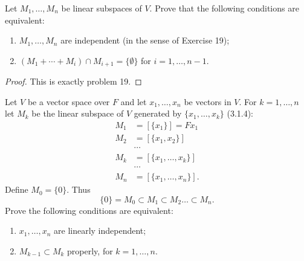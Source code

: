 \begin{tcolorbox}[title=Problem 23, breakable]
    Let $M_1, \ldots, M_n$ be linear subspaces of $V$. 
    Prove that the following conditions are equivalent:
    \begin{enumerate}
        \item $M_1, \ldots, M_n$ are independent (in the sense of Exercise 19);
        \item $(M_1 + \cdots + M_i) \cap M_{i + 1} = \{\emptyset\}$ for $i = 1, \ldots, n - 1$.
    \end{enumerate}
\end{tcolorbox}

\begin{proof}
    This is exactly problem 19.
\end{proof}

\begin{tcolorbox}[title=Problem 24, breakable]
    Let $V$ be a vector space over $F$ and let $x_1, \ldots, x_n$
    be vectors in $V$. For $k = 1, \ldots, n$ let $M_k$ be the 
    linear subspace of $V$ generated by $\{x_1, \ldots, x_k\}$ (3.1.4):
    \begin{align*}
        M_1   &= [\{x_1\}] = F x_1 \\
        M_2   &= [\{x_1, x_2\}] \\
        &\cdots \\
        M_k   &= [\{x_1, \ldots, x_k\}] \\
        &\cdots \\
        M_n   &= [\{x_1, \ldots, x_n\}].
    \end{align*}
    Define $M_0 = \{0\}$. Thus 
    \[\{0\} = M_0 \subset M_1 \subset M_2 \ldots \subset M_n.\]
    Prove the following conditions are equivalent:
    \begin{enumerate}
        \item $x_1, \ldots, x_n$ are linearly independent;
        \item $M_{k - 1} \subset M_k$ properly, for $k = 1, \ldots, n$.
    \end{enumerate}
\end{tcolorbox}

